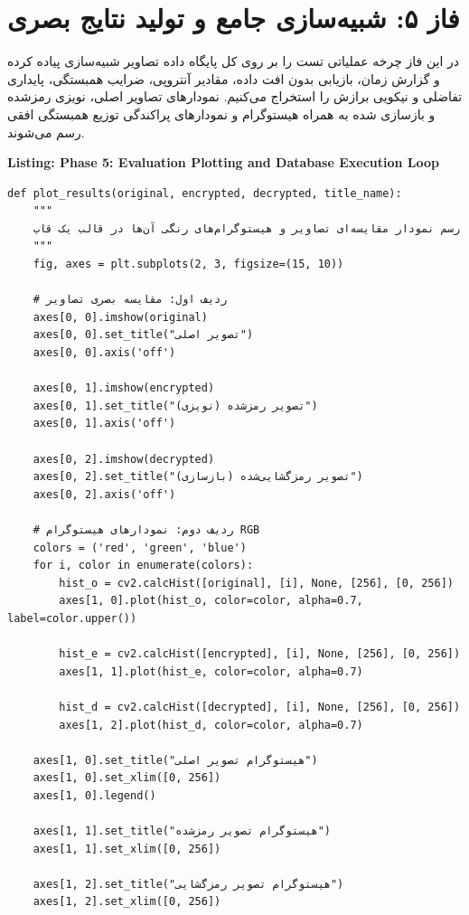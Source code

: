 \section{فاز ۵: شبیه‌سازی جامع و تولید نتایج بصری}
در این فاز چرخه عملیاتی تست را بر روی کل پایگاه داده تصاویر شبیه‌سازی پیاده کرده و گزارش زمان، بازیابی بدون افت داده، مقادیر آنتروپی، ضرایب همبستگی، پایداری تفاضلی و نیکویی برازش را استخراج می‌کنیم. نمودارهای تصاویر اصلی، نویزی رمزشده و بازسازی شده به همراه هیستوگرام و نمودارهای پراکندگی توزیع همبستگی افقی رسم می‌شوند.

\begin{latin}
\noindent\textbf{Listing: Phase 5: Evaluation Plotting and Database Execution Loop}
\begin{verbatim}
def plot_results(original, encrypted, decrypted, title_name):
    """
    رسم نمودار مقایسه‌ای تصاویر و هیستوگرام‌های رنگی آن‌ها در قالب یک قاب
    """
    fig, axes = plt.subplots(2, 3, figsize=(15, 10))
    
    # ردیف اول: مقایسه بصری تصاویر
    axes[0, 0].imshow(original)
    axes[0, 0].set_title("تصویر اصلی")
    axes[0, 0].axis('off')
    
    axes[0, 1].imshow(encrypted)
    axes[0, 1].set_title("تصویر رمزشده (نویزی)")
    axes[0, 1].axis('off')
    
    axes[0, 2].imshow(decrypted)
    axes[0, 2].set_title("تصویر رمزگشایی‌شده (بازسازی)")
    axes[0, 2].axis('off')
    
    # ردیف دوم: نمودارهای هیستوگرام RGB
    colors = ('red', 'green', 'blue')
    for i, color in enumerate(colors):
        hist_o = cv2.calcHist([original], [i], None, [256], [0, 256])
        axes[1, 0].plot(hist_o, color=color, alpha=0.7, label=color.upper())
        
        hist_e = cv2.calcHist([encrypted], [i], None, [256], [0, 256])
        axes[1, 1].plot(hist_e, color=color, alpha=0.7)
        
        hist_d = cv2.calcHist([decrypted], [i], None, [256], [0, 256])
        axes[1, 2].plot(hist_d, color=color, alpha=0.7)
        
    axes[1, 0].set_title("هیستوگرام تصویر اصلی")
    axes[1, 0].set_xlim([0, 256])
    axes[1, 0].legend()
    
    axes[1, 1].set_title("هیستوگرام تصویر رمزشده")
    axes[1, 1].set_xlim([0, 256])
    
    axes[1, 2].set_title("هیستوگرام تصویر رمزگشایی")
    axes[1, 2].set_xlim([0, 256])
    

\end{verbatim}
\end{latin}
